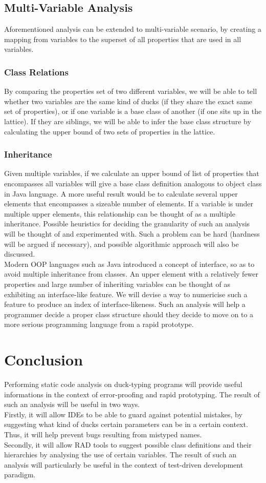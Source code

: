 \documentclass[a4paper,12pt]{article}
\begin{document}
\subsection{Multi-Variable Analysis}
Aforementioned analysis can be extended to multi-variable scenario, by creating a mapping from variables to the superset of all properties that are used in all variables.
\subsubsection{Class Relations}
By comparing the properties set of two different variables, we will be able to tell whether two variables are the same kind of ducks (if they share the exact same set of properties), or if one variable is a base class of another (if one sits up in the lattice). If they are siblings, we will be able to infer the base class structure by calculating the upper bound of two sets of properties in the lattice.
\subsubsection{Inheritance}
Given multiple variables, if we calculate an upper bound of list of properties that encompasses all variables will give a base class definition analogous to object class in Java language. A more useful result would be to calculate several upper elements that encompasses a sizeable number of elements. If a variable is under multiple upper elements, this relationship can be thought of as a multiple inheritance. Possible heuristics for deciding the granularity of such an analysis will be thought of and experimented with. Such a problem can be hard (hardness will be argued if necessary), and possible algorithmic approach will also be discussed.\\
Modern OOP languages such as Java introduced a concept of interface, so as to avoid multiple inheritance from classes. An upper element with a relatively fewer properties and large number of inheriting variables can be thought of as exhibiting an interface-like feature. We will devise a way to numericise such a feature to produce an index of interface-likeness. Such an analysis will help a programmer decide a proper class structure should they decide to move on to a more serious programming language from a rapid prototype.
\section{Conclusion}
Performing static code analysis on duck-typing programs will provide useful informations in the context of error-proofing and rapid prototyping. The result of such an analysis will be useful in two ways.\\ 
Firstly, it will allow IDEs to be able to guard against potential mistakes, by suggesting what kind of ducks certain parameters can be in a certain context. Thus, it will help prevent bugs resulting from mistyped names.\\
Secondly, it will allow RAD tools to suggest possible class definitions and their hierarchies by analysing the use of certain variables. The result of such an analysis will particularly be useful in the context of test-driven development paradigm.\\
\end{document}

